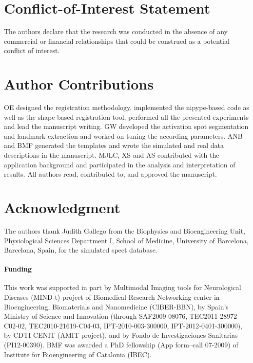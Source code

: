\documentclass{frontiers}
\begin{document}
\section*{Conflict-of-Interest Statement}
The authors declare that the research was conducted in the absence of any commercial or financial relationships 
that could be construed as a potential conflict of interest.

\section*{Author Contributions}
OE designed the registration methodology, implemented the \gls*{nipype}-based code
  as well as the shape-based registration tool, performed all the presented experiments
  and lead the manuscript writing.
GW developed the activation spot segmentation and landmark extraction
  and worked on tuning the according parameters.
ANB and BMF generated the templates and wrote the simulated and real data
  descriptions in the manuscript.
MJLC, XS and AS contributed with the application background and participated
  in the analysis and interpretation of results.
All authors read, contributed to, and approved the manuscript.

\section*{Acknowledgment}
The authors thank Judith Gallego from the Biophysics and Bioengineering Unit, Physiological Sciences Department I,
School of Medicine, University of Barcelona, Barcelona, Spain, for the simulated \gls*{spect} database.
\paragraph{Funding\textcolon} This work was supported in part by Multimodal Imaging tools for Neurological Diseases (MIND-t) 
  project of Biomedical Research Networking center in Bioengineering, Biomaterials and Nanomedicine (CIBER-BBN), 
  by Spain's Ministry of Science and Innovation (through SAF2009-08076, TEC2011-28972-C02-02, TEC2010-21619-C04-03,
  IPT-2010-003-300000, IPT-2012-0401-300000), by CDTI-CENIT (AMIT project), and by Fondo de Investigaciones Sanitarias (PI12-00390).
BMF was awarded a PhD fellowship (App form--call 07-2009) of Institute for Bioengineering of Catalonia (IBEC).

\end{document}
